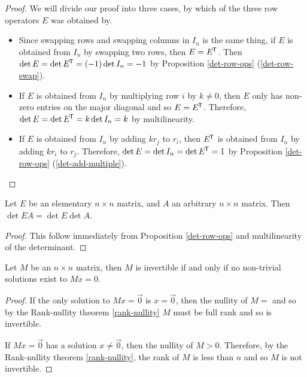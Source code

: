 \begin{proof}
    We will divide our proof into three cases, by which of the three row operators $E$ was obtained by.

    \begin{itemize}
        \item Since swapping rows and swapping columns in $I_n$ is the same thing, if $E$ is obtained from $I_n$ by swapping two rows, then $E = {E}^{\mkern-1.5mu\mathsf{T}}$. Then $\det E = \det{E}^{\mkern-1.5mu\mathsf{T}} = (-1)\det I_n = -1$ by Proposition \ref{det-row-ops} (\ref{det-row-swap}).
        \item If $E$ is obtained from $I_n$ by multiplying row $i$ by $k \neq 0$, then $E$ only has non-zero entries on the major diagonal and so $E = {E}^{\mkern-1.5mu\mathsf{T}}$. Therefore, $\det E = \det{E}^{\mkern-1.5mu\mathsf{T}} = k \det I_n = k$ by multilinearity.
        \item If $E$ is obtained from $I_n$ by adding $kr_j$ to $r_i$, then ${E}^{\mkern-1.5mu\mathsf{T}}$ is obtained from $I_n$ by adding $kr_i$ to $r_j$. Therefore, $\det E = \det I_n = \det{E}^{\mkern-1.5mu\mathsf{T}} = 1$ by Proposition \ref{det-row-ops} (\ref{det-add-multiple}).
    \end{itemize}
\end{proof}

\begin{lemma}\label{determinant-respects-elementary-product}
    Let $E$ be an elementary $n \times n$ matrix, and $A$ an arbitrary $n \times n$ matrix. Then $\det EA = \det E \det A$.
\end{lemma}

\begin{proof}
    This follow immediately from Proposition \ref{det-row-ops} and multilinearity of the determinant.
\end{proof}

\begin{lemma}\label{invertible-matrix-solutions}
    Let $M$ be an $n \times n$ matrix, then $M$ is invertible if and only if no non-trivial solutions exist to $Mx = 0$.
\end{lemma}

\begin{proof}
    If the only solution to $Mx = \vec{0}$ is $x = \vec{0}$, then the nullity of $M = $ and so by the Rank-nullity theorem \ref{rank-nullity} $M$ must be full rank and so is invertible.

    If $Mx = \vec{0}$ has a solution $x \neq \vec{0}$, then the nullity of $M > 0$. Therefore, by the Rank-nullity theorem \ref{rank-nullity}, the rank of $M$ is less than $n$ and so $M$ is not invertible.
\end{proof}

